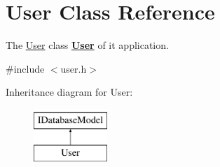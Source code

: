 \hypertarget{classUser}{\section{User Class Reference}
\label{classUser}
}


The \hyperlink{classUser}{User} class {\bfseries \hyperlink{classUser}{User}} of it application.  




{\ttfamily \#include $<$user.\-h$>$}

Inheritance diagram for User\-:\begin{figure}[H]
\begin{center}
\leavevmode
\includegraphics[height=2.000000cm]{d9/dc0/classUser}
\end{center}
\end{figure}
